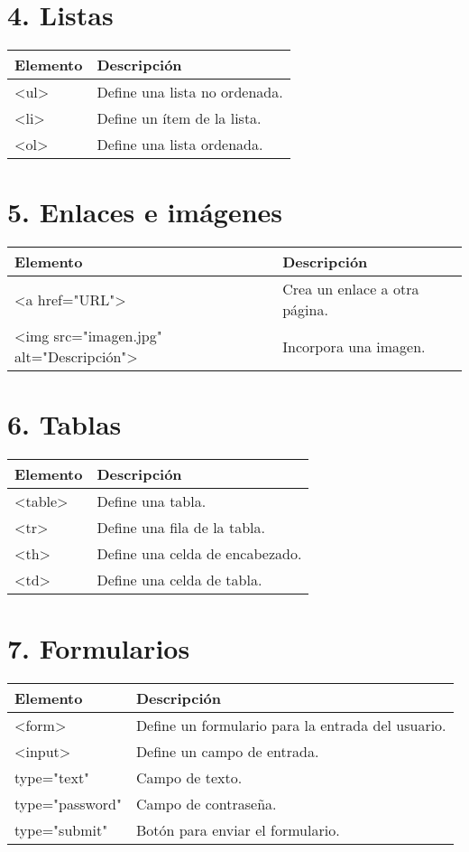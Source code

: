 \documentclass{article}
\begin{document}
\section*{4. Listas}
\begin{tabular}{>{\ttfamily}l p{10cm}}
\textnormal{Elemento} & Descripción \\
\hline
<ul> & Define una lista no ordenada. \\
<li> & Define un ítem de la lista. \\
<ol> & Define una lista ordenada. \\
\end{tabular}

\section*{5. Enlaces e imágenes}
\begin{tabular}{>{\ttfamily}l p{10cm}}
\textnormal{Elemento} & Descripción \\
\hline
<a href="URL"> & Crea un enlace a otra página. \\
<img src="imagen.jpg" alt="Descripción"> & Incorpora una imagen. \\
\end{tabular}

\section*{6. Tablas}
\begin{tabular}{>{\ttfamily}l p{10cm}}
\textnormal{Elemento} & Descripción \\
\hline
<table> & Define una tabla. \\
<tr> & Define una fila de la tabla. \\
<th> & Define una celda de encabezado. \\
<td> & Define una celda de tabla. \\
\end{tabular}

\section*{7. Formularios}
\begin{tabular}{>{\ttfamily}l p{10cm}}
\textnormal{Elemento} & Descripción \\
\hline
<form> & Define un formulario para la entrada del usuario. \\
<input> & Define un campo de entrada. \\
type="text" & Campo de texto. \\
type="password" & Campo de contraseña. \\
type="submit" & Botón para enviar el formulario. \\
\end{tabular}
\end{document}
